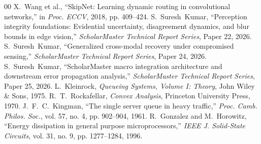 \documentclass[conference]{IEEEtran}
\begin{document}
\begin{thebibliography}{00}
 X.~Wang et al., ``SkipNet: Learning dynamic routing in convolutional networks,'' in \emph{Proc. ECCV}, 2018, pp. 409--424.
 S.~Suresh~Kumar, ``Perception integrity foundations: Evidential uncertainty, disagreement dynamics, and blur bounds in edge vision,'' \emph{ScholarMaster Technical Report Series}, Paper 22, 2026.
 S.~Suresh~Kumar, ``Generalized cross-modal recovery under compromised sensing,'' \emph{ScholarMaster Technical Report Series}, Paper 24, 2026.
 S.~Suresh~Kumar, ``ScholarMaster macro integration architecture and downstream error propagation analysis,'' \emph{ScholarMaster Technical Report Series}, Paper 25, 2026.
 L.~Kleinrock, \emph{Queueing Systems, Volume I: Theory}, John Wiley \& Sons, 1975.
 R.~T.~Rockafellar, \emph{Convex Analysis}, Princeton University Press, 1970.
 J.~F.~C.~Kingman, ``The single server queue in heavy traffic,'' \emph{Proc. Camb. Philos. Soc.}, vol. 57, no. 4, pp. 902--904, 1961.
 R.~Gonzalez and M.~Horowitz, ``Energy dissipation in general purpose microprocessors,'' \emph{IEEE J. Solid-State Circuits}, vol. 31, no. 9, pp. 1277--1284, 1996.
\end{thebibliography}
\end{document}
